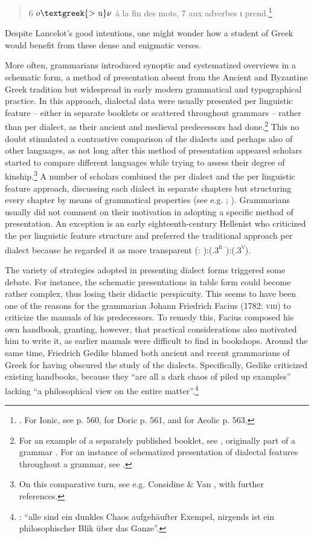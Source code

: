 \begin{quote}
6 $o\text{\textgreek{>~u}}\nu $ à la fin des mots, 7 aux adverbes ι prend.\footnote{\citet[558]{Lancelot1655}. For Ionic, see p. 560, for Doric p. 561, and for Aeolic p. 563.}
\end{quote}

Despite Lancelot’s good intentions, one might wonder how a student of Greek would benefit from these dense and enigmatic verses.

More often, grammarians introduced synoptic and systematized overviews in a schematic form, a method of presentation absent from the Ancient and Byzantine Greek tradition but widespread in early modern grammatical and typographical practice. In this approach, dialectal data were usually presented per linguistic feature – either in separate booklets or scattered throughout grammars – rather than per dialect, as their ancient and medieval predecessors had done.\footnote{For an example of a separately published booklet, see \citet{Amerot1530}, originally part of a grammar \citep{Amerot1520}. For an instance of schematized presentation of dialectal features throughout a grammar, see \citet{Gretser1593}.} This no doubt stimulated a contrastive comparison of the dialects and perhaps also of other languages, as not long after this method of presentation appeared scholars started to compare different languages while trying to assess their degree of kinship.\footnote{On this comparative turn, see e.g. Considine \& Van \citet{Hal2010}, with further references.} A number of scholars combined the per dialect and the per linguistic feature approach, discussing each dialect in separate chapters but structuring every chapter by means of grammatical properties (see e.g. \citealt{Zwinger1605}; \citealt{Mérigon1621}). Grammarians usually did not comment on their motivation in adopting a specific method of presentation. An exception is an early eighteenth-century Hellenist who criticized the per linguistic feature structure and preferred the traditional approach per dialect because he regarded it as more transparent (\citealt{Heupel1712}: ):(.3\textsc{\textsuperscript{r–}}):(.3\textsc{\textsuperscript{v}}).

The variety of strategies adopted in presenting dialect forms triggered some debate. For instance, the schematic presentations in table form could become rather complex, thus losing their didactic perspicuity. This seems to have been one of the reasons for the grammarian Johann Friedrich Facius (1782: \textsc{viii}) to criticize the manuals of his predecessors. To remedy this, Facius composed his own handbook, granting, however, that practical considerations also motivated him to write it, as earlier manuals were difficult to find in bookshops. Around the same time, Friedrich Gedike blamed both ancient and recent grammarians of Greek for having obscured the study of the dialects. Specifically, Gedike criticized existing handbooks, because they “are all a dark chaos of piled up examples” lacking “a philosophical view on the entire matter”.\footnote{\citet[4]{Gedike1782}: “alle sind ein dunkles Chaos aufgehäufter Exempel, nirgends ist ein philosophischer Blik über das Ganze”.}

